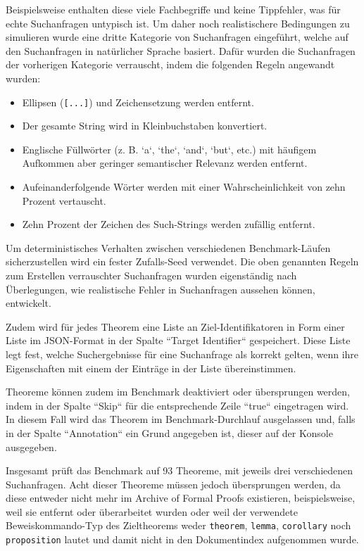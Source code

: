 \documentclass[12pt,letterpaper]{article} %
\begin{document}
\begin{enumerate}
  Beispielsweise enthalten diese viele Fachbegriffe und keine Tippfehler, was für echte Suchanfragen untypisch ist.
  Um daher noch realistischere Bedingungen zu simulieren wurde eine dritte Kategorie von Suchanfragen eingeführt, welche auf den Suchanfragen in natürlicher Sprache basiert.
  Dafür wurden die Suchanfragen der vorherigen Kategorie verrauscht, indem die folgenden Regeln angewandt wurden:
  \begin{itemize}
    \item Ellipsen (\texttt{[...]}) und Zeichensetzung werden entfernt.
    \item Der gesamte String wird in Kleinbuchstaben konvertiert.
    \item Englische Füllwörter (z. B. `a`, `the`, `and`, `but`, etc.) mit häufigem Aufkommen aber geringer semantischer Relevanz werden entfernt.
    \item Aufeinanderfolgende Wörter werden mit einer Wahrscheinlichkeit von zehn Prozent vertauscht.
    \item Zehn Prozent der Zeichen des Such-Strings werden zufällig entfernt.
  \end{itemize}
  Um deterministisches Verhalten zwischen verschiedenen Benchmark-Läufen sicherzustellen wird ein fester Zufalls-Seed verwendet. Die oben genannten Regeln zum Erstellen verrauschter Suchanfragen wurden eigenständig nach Überlegungen, wie realistische Fehler in Suchanfragen aussehen können, entwickelt.
\end{enumerate}

Zudem wird für jedes Theorem eine Liste an Ziel-Identifikatoren in Form einer Liste im JSON-Format in der Spalte ``Target Identifier`` gespeichert.
Diese Liste legt fest, welche Suchergebnisse für eine Suchanfrage als korrekt gelten, wenn ihre Eigenschaften mit einem der Einträge in der Liste übereinstimmen.

Theoreme können zudem im Benchmark deaktiviert oder übersprungen werden, indem in der Spalte ``Skip`` für die entsprechende Zeile ``true`` eingetragen wird.
In diesem Fall wird das Theorem im Benchmark-Durchlauf ausgelassen und, falls in der Spalte ``Annotation`` ein Grund angegeben ist, dieser auf der Konsole ausgegeben.

Insgesamt prüft das Benchmark auf 93 Theoreme, mit jeweils drei verschiedenen Suchanfragen. Acht dieser Theoreme müssen jedoch übersprungen werden, da diese entweder nicht mehr im Archive of Formal Proofs existieren, beispielsweise, weil sie entfernt oder überarbeitet wurden oder weil der verwendete Beweiskommando-Typ des Zieltheorems weder \texttt{theorem}, \texttt{lemma}, \texttt{corollary} noch \texttt{proposition} lautet und damit nicht in den Dokumentindex aufgenommen wurde.
\end{document}
